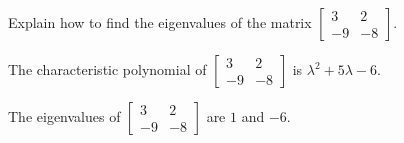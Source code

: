 
\begin{exerciseStatement}


Explain how to find the eigenvalues of the matrix \( \left[\begin{array}{cc}
3 & 2 \\
-9 & -8
\end{array}\right] \).


\end{exerciseStatement}
    
\begin{exerciseAnswer} 


The characteristic polynomial of \( \left[\begin{array}{cc}
3 & 2 \\
-9 & -8
\end{array}\right] \) is \( \lambda^{2} + 5 \lambda - 6 \).



The eigenvalues of \( \left[\begin{array}{cc}
3 & 2 \\
-9 & -8
\end{array}\right] \) are \( 1 \) and \( -6 \).


\end{exerciseAnswer}
    

